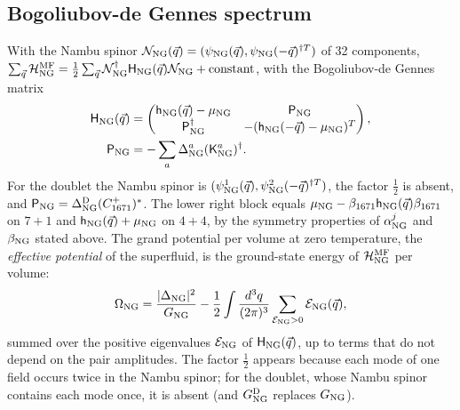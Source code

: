 \subsection{Bogoliubov-de Gennes spectrum}

With the Nambu spinor $\mathcal N_{\rm NG}(\vec q)=(\psi_{\rm NG}(\vec q),\psi_{\rm NG}(-\vec q)^{\dagger T})$ of
32 components, $\sum_{\vec q}\mathcal H^{\rm MF}_{\rm NG}=\tfrac12\sum_{\vec q}\mathcal N^\dagger_{\rm NG}
\mathsf H_{\rm NG}(\vec q)\mathcal N_{\rm NG}+\text{constant}$, with the Bogoliubov-de Gennes matrix
\begin{align}
\mathsf H_{\rm NG}(\vec q)&=\begin{pmatrix}\mathsf h_{\rm NG}(\vec q)-\mu_{\rm NG}&\mathsf P_{\rm NG}\\
\mathsf P_{\rm NG}^\dagger&-(\mathsf h_{\rm NG}(-\vec q)-\mu_{\rm NG})^T\end{pmatrix},\nonumber\\
\mathsf P_{\rm NG}&=-\sum_a\Delta^a_{\rm NG}(\mathsf K^a_{\rm NG})^\dagger.
\label{eq:bdg}
\end{align}
For the doublet the Nambu spinor is $(\psi^1_{\rm NG}(\vec q),\psi^2_{\rm NG}(-\vec q)^{\dagger T})$, the factor
$\tfrac12$ is absent, and $\mathsf P_{\rm NG}=\Delta^{\rm D}_{\rm NG}(C^+_{1671})^*$. The lower right block equals
$\mu_{\rm NG}-\beta_{1671}\mathsf h_{\rm NG}(\vec q)\beta_{1671}$ on $7+1$ and $\mathsf h_{\rm NG}(\vec q)+
\mu_{\rm NG}$ on $4+4$, by the symmetry properties of $\alpha^j_{\rm NG}$ and $\beta_{\rm NG}$ stated above.
The grand potential per volume at zero temperature, the \emph{effective potential} of the superfluid,
is the ground-state energy of $\mathcal H^{\rm MF}_{\rm NG}$ per volume:
\begin{equation}
\Omega_{\rm NG}=\frac{\lvert\Delta_{\rm NG}\rvert^2}{G_{\rm NG}}-\frac12\int\frac{d^3q}{(2\pi)^3}
\sum_{\mathcal E_{\rm NG}>0}\mathcal E_{\rm NG}(\vec q),
\label{eq:omega}
\end{equation}
summed over the positive eigenvalues $\mathcal E_{\rm NG}$ of $\mathsf H_{\rm NG}(\vec q)$, up to terms that do not
depend on the pair amplitudes. The factor $\tfrac12$ appears because each mode of one field occurs twice in
the Nambu spinor; for the doublet, whose Nambu spinor contains each mode once, it is absent (and
$G^{\rm D}_{\rm NG}$ replaces $G_{\rm NG}$).

